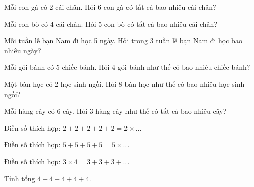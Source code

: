 \begin{ex}
Mỗi con gà có 2 cái chân. Hỏi 6 con gà có tất cả bao nhiêu cái chân?
\end{ex}

\begin{ex}
Mỗi con bò có 4 cái chân. Hỏi 5 con bò có tất cả bao nhiêu cái chân?
\end{ex}

\begin{ex}
Mỗi tuần lễ bạn Nam đi học 5 ngày. Hỏi trong 3 tuần lễ bạn Nam đi học bao nhiêu ngày?
\end{ex}

\begin{ex}
Mỗi gói bánh có 5 chiếc bánh. Hỏi 4 gói bánh như thế có bao nhiêu chiếc bánh?
\end{ex}

\begin{ex}
Một bàn học có 2 học sinh ngồi. Hỏi 8 bàn học như thế có bao nhiêu học sinh ngồi?
\end{ex}

\begin{ex}
Mỗi hàng cây có 6 cây. Hỏi 3 hàng cây như thế có tất cả bao nhiêu cây?
\end{ex}

\begin{ex}
Điền số thích hợp: $2 + 2 + 2 + 2 + 2 = 2 \times \dots$
\end{ex}

\begin{ex}
Điền số thích hợp: $5 + 5 + 5 + 5 = 5 \times \dots$
\end{ex}

\begin{ex}
Điền số thích hợp: $3 \times 4 = 3 + 3 + 3 + \dots$
\end{ex}

\begin{ex}
Tính tổng $4 + 4 + 4 + 4 + 4$.
\end{ex}

